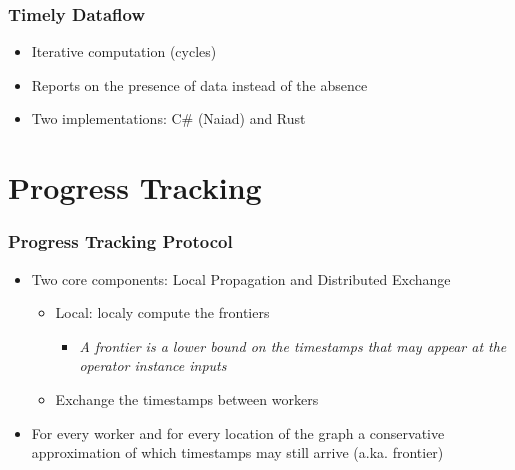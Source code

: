 \documentclass[aspectratio=169,10pt]{beamer}
\begin{document}
\begin{frame}
  \frametitle{Timely Dataflow}
  \begin{figure}
  \end{figure}
  \pause
  \begin{itemize}
    \item Iterative computation (cycles)
          \pause
    \item Reports on the presence of data instead of the absence
          \pause
    \item Two implementations: C\# (Naiad) and Rust
  \end{itemize}
\end{frame}

\section{Progress Tracking}

\begin{frame}
  \frametitle{Progress Tracking Protocol}
  \begin{itemize}
    \item Two core components: Local Propagation and Distributed Exchange
          \begin{itemize}
            \item Local: localy compute the frontiers
                  \begin{itemize}
                    \item \textit{A frontier is a lower bound on the timestamps that may appear at the operator instance inputs}
                  \end{itemize}
            \item Exchange the timestamps between workers
          \end{itemize}
          \pause
    \item For every worker and for every location of the graph a conservative approximation of which timestamps may still arrive (a.ka. frontier)
  \end{itemize}
\end{frame}
\end{document}
